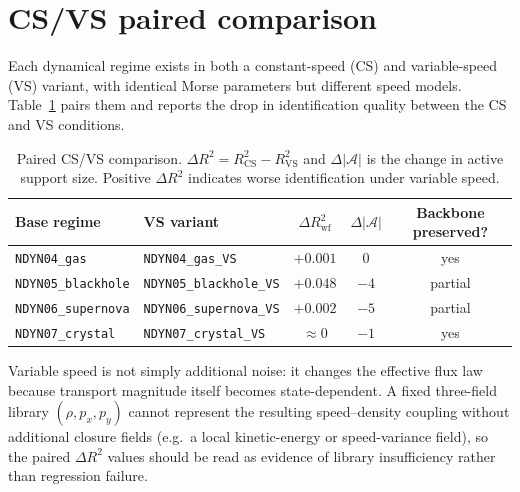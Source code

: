
\section{CS/VS paired comparison}
\label{sec:wsindy_cs_vs_paired}

Each dynamical regime exists in both a constant-speed (CS) and
variable-speed (VS) variant, with identical Morse parameters but
different speed models.  Table~\ref{tab:cs_vs_paired} pairs them and
reports the drop in identification quality between the CS and VS conditions.

\begin{table}[ht]
\centering
\caption{Paired CS/VS comparison.  $\Delta R^2 = R^2_{\text{CS}} - R^2_{\text{VS}}$
and $\Delta|\mathcal{A}|$ is the change in active support size.  Positive
$\Delta R^2$ indicates worse identification under variable speed.}
\label{tab:cs_vs_paired}
\renewcommand{\arraystretch}{0.95}
\small
\begin{tabular}{llccc}
\toprule
\textbf{Base regime} & \textbf{VS variant} & $\Delta R^2_{\text{wf}}$ & $\Delta|\mathcal{A}|$ & Backbone preserved? \\
\midrule
\texttt{NDYN04\_gas} & \texttt{NDYN04\_gas\_VS} & $+0.001$ & $0$ & yes \\
\texttt{NDYN05\_blackhole} & \texttt{NDYN05\_blackhole\_VS} & $+0.048$ & $-4$ & partial \\
\texttt{NDYN06\_supernova} & \texttt{NDYN06\_supernova\_VS} & $+0.002$ & $-5$ & partial \\
\texttt{NDYN07\_crystal} & \texttt{NDYN07\_crystal\_VS} & $\approx 0$ & $-1$ & yes \\
\bottomrule
\end{tabular}
\end{table}

Variable speed is not simply additional noise: it changes the effective
flux law because transport magnitude itself becomes state-dependent.
A fixed three-field library $(\rho, p_x, p_y)$ cannot represent the
resulting speed--density coupling without additional closure fields
(e.g.\ a local kinetic-energy or speed-variance field), so the paired
$\Delta R^2$ values should be read as evidence of library insufficiency
rather than regression failure.

